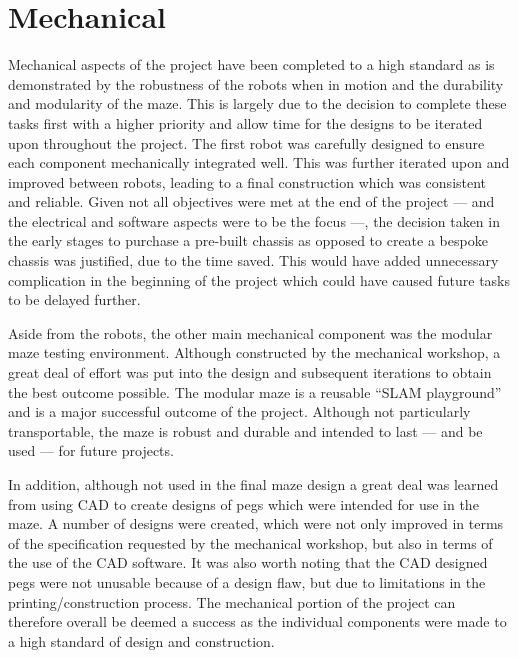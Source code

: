 \section{Mechanical}\label{eval/mech} 
Mechanical aspects of the project have been completed to a 
high standard as is demonstrated by the robustness of the robots when in 
motion and the durability and modularity of the maze. This is largely due to the 
decision to complete these tasks first with a higher priority and allow time for the 
designs to be iterated upon throughout the project. The first robot was carefully 
designed to ensure each component mechanically integrated well. This was further 
iterated upon and improved between robots, leading to a final construction which was 
consistent and reliable. Given not all objectives were met at the end of the project 
--- and the electrical and software aspects were to be the focus ---, the decision taken in the 
early stages to purchase a pre-built chassis as opposed to create a bespoke chassis 
was justified, due to the time saved. This would have added unnecessary complication 
in the beginning of the project which could have caused future 
tasks to be delayed further. 

Aside from the robots, the other main mechanical component was the modular maze 
testing environment. Although constructed by the mechanical workshop, a great deal of 
effort was put into the design and subsequent iterations to obtain the best outcome 
possible. The modular maze is a reusable ``SLAM playground'' and is a major 
successful outcome of the project. Although not particularly transportable, the maze 
is robust and durable and intended to last --- and be used --- for future projects.

In addition, although not used in the final maze design a great deal was learned from 
using CAD to create designs of pegs which were intended for use in the maze. A number 
of designs were created, which were not only improved in terms of the specification 
requested by the mechanical workshop, but also in terms of the use of the CAD 
software. It was also worth noting that the CAD designed pegs were not unusable because of a design flaw, but due to limitations in the printing/construction process. The mechanical portion of the project can therefore overall be deemed a success as 
the individual components were made to a high standard of design and construction. 

